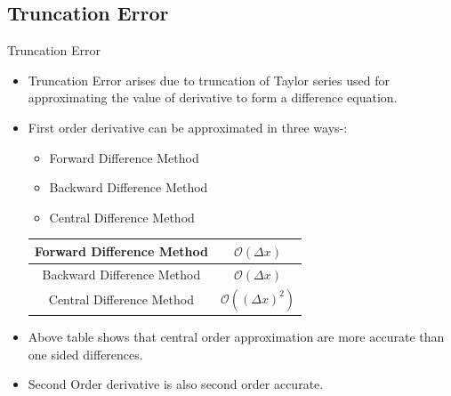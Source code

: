 \documentclass[9 pt]{beamer}
\newcommand{\mcm}[1]{\mathcal{#1}}
\begin{document}
		\subsection{Truncation Error}
		\begin{frame}{Truncation Error}
			\begin{itemize}
				\item Truncation Error arises due to truncation of Taylor series used for approximating the value of derivative to form a difference equation.
				\item First order derivative can be approximated in three ways-:
					\begin{itemize}
						\item Forward Difference Method
						\item Backward Difference Method
						\item Central Difference Method \\
						\medskip
					\end{itemize}
				
						\begin{center}
							
							\begin{tabular}{ || c| c || } 
								\hline 
								Forward Difference Method &  $ \mcm{O}(\Delta x)$ \\ 
								\hline 
								Backward Difference Method &$ \mcm{O}(\Delta x)$  \\ 
								\hline 
								Central Difference Method &  $ \mcm{O}((\Delta x)^2) $ \\ 
								\hline \hline
							\end{tabular}
						\end{center}
						\item Above table shows that central order approximation are more accurate than one sided differences.
						\item Second Order derivative is also second order accurate.
				
			\end{itemize}
		\end{frame}
\end{document}
